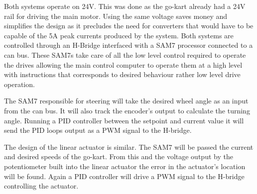 Both systems operate on 24V. This was done as the go-kart already had a 24V rail
for driving the main motor. Using the same voltage saves money and simplifies
the design as it precludes the need for converters that would have to be capable
of the 5A peak currents produced by the system. Both systems are controlled
through an H-Bridge interfaced with a SAM7 processor connected to a can bus.
These SAM7s take care of all the low level control required to operate the
drives allowing the main control computer to operate them at a high level with
instructions that corresponds to desired behaviour rather low level drive
operation.

The SAM7 responsible for steering will take the desired wheel angle as an input
from the can bus. It will also track the encoder's output to calculate the
turning angle. Running a PID controller between the setpoint and current value
it will send the PID loops output as a PWM signal to the H-bridge.

The design of the linear actuator is similar. The SAM7 will be passed the
current and desired speeds of the go-kart. From this and the voltage output by
the potentiometer built into the linear actuator the error in the actuator's
location will be found. Again a PID controller will drive a PWM signal to the
H-bridge controlling the actuator.
